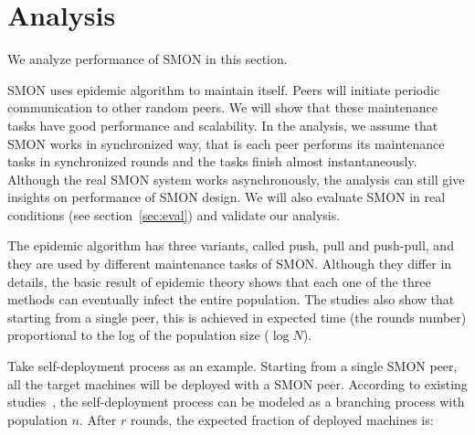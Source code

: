 \section{Analysis}
\label{sec:analysis}

We analyze performance of SMON in this section.

SMON uses epidemic algorithm to maintain itself. Peers will
initiate periodic communication to other random peers. We
will show that these maintenance tasks have good
performance and scalability. In the analysis, we assume that
SMON works in synchronized way, that is each peer performs
its maintenance tasks in synchronized rounds and the tasks
finish almost instantaneously. Although the real SMON system
works asynchronously, the analysis can still give insights
on performance of SMON design. We will also evaluate SMON in
real conditions (see section~\ref{sec:eval}) and validate
our analysis.


The epidemic algorithm has three variants, called push, pull
and push-pull, and they are used by different maintenance
tasks of SMON.
Although they differ in details, the basic result of
epidemic theory shows that each one of the three methods can
eventually infect the entire population.  The studies also
show that starting from a single peer, this is achieved in
expected time (the rounds number) proportional to the log of
the population size ($\log N$).

%
%
%
%
%
%
%

Take self-deployment process as an example. Starting from a
single SMON peer, all the target machines will be deployed
with a SMON peer.  According to existing
studies~\cite{Eugster2004}, the self-deployment process can
be modeled as a branching process with population $n$. After
$r$ rounds, the expected fraction of deployed machines is:

